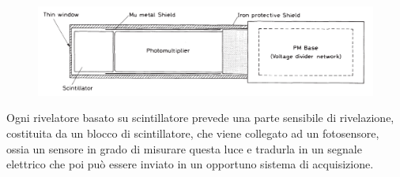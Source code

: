 \begin{figure}[H]
   \centering
   \includegraphics[width=\textwidth]{immagini/struttura_base_scintillatore.png}
\end{figure}

Ogni rivelatore basato su scintillatore prevede una parte sensibile di rivelazione, costituita da un blocco di scintillatore, che viene collegato ad un fotosensore, ossia un sensore in grado di misurare questa luce e tradurla in un segnale elettrico che poi può essere inviato in un opportuno sistema di acquisizione.

